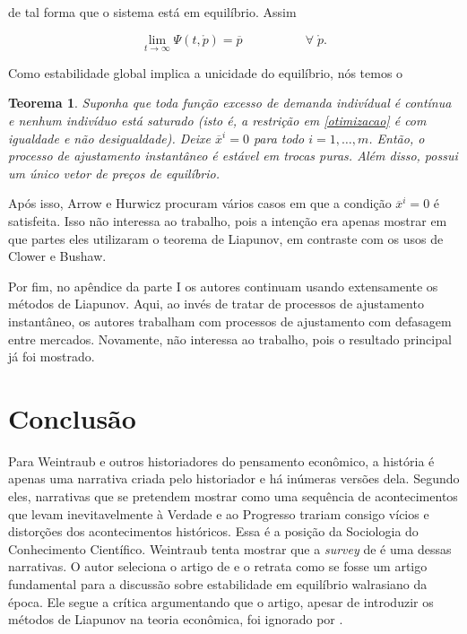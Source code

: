 \documentclass[
	12pt,				%
	openright,			%
	twoside,			%
	a4paper,			%
	english,			%
	french,				%
	spanish,			%
	brazil				%
	]{abntex2}
\newtheorem{teorema}{Teorema}[chapter]
\newcommand{\espaco}{\hspace{5em}}
\newcommand{\solucao}{\Psi(t, \mathring{p})}
\newcommand{\pbola}{\mathring{p}}
\newcommand{\pbarra}{\overline{p}}
\newcommand{\xbarra}{\overline{x}}
\begin{document}
de tal forma que o sistema está em equilíbrio. Assim

\begin{equation}
	\lim_{t \to \infty} \solucao = \pbarra \espaco \forall \; \pbola.
\end{equation}

Como estabilidade global implica a unicidade do equilíbrio, nós temos o

\begin{teorema}
	Suponha que toda função excesso de demanda indivídual é contínua e nenhum indivíduo
	está saturado (isto é, a restrição em \ref{otimizacao} é com igualdade e não desigualdade).
	Deixe $\xbarra^i = 0$ para todo $i = 1, \ldots, m$. Então, o processo de ajustamento
	instantâneo é estável em trocas puras. Além disso, possui um único vetor de preços de equilíbrio.
\end{teorema}

Após isso, Arrow e Hurwicz procuram vários casos em que a condição $\xbarra^i = 0$
é satisfeita. Isso não interessa ao trabalho, pois a intenção era apenas mostrar
em que partes eles utilizaram o teorema de Liapunov, em contraste com os usos
de Clower e Bushaw.

Por fim, no apêndice da parte I os autores continuam usando extensamente os métodos de
Liapunov. Aqui, ao invés de tratar de processos de ajustamento instantâneo, os autores
trabalham com processos de ajustamento com defasagem entre mercados. Novamente,
não interessa ao trabalho, pois o resultado principal já foi mostrado.


\chapter{Conclusão}

Para Weintraub e outros historiadores do pensamento econômico, a história é
apenas uma narrativa criada pelo historiador e há inúmeras versões dela.
Segundo eles, narrativas que se pretendem mostrar como uma sequência de
acontecimentos que levam inevitavelmente à Verdade e ao Progresso trariam
consigo vícios e distorções dos acontecimentos históricos. Essa é a posição
da Sociologia do Conhecimento Científico. Weintraub tenta mostrar
que a \textit{survey} de  é uma dessas narrativas.
O autor seleciona o artigo de  e o retrata como se
fosse um artigo fundamental para a discussão sobre estabilidade em equilíbrio
walrasiano da época. Ele segue a crítica argumentando que o artigo, apesar de
introduzir os métodos de Liapunov na teoria econômica, foi ignorado por
.
\end{document}

